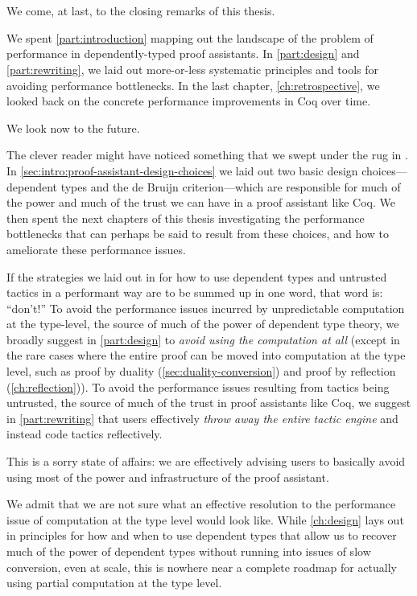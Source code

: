 \chapter{}\label{ch:conclusion}
We come, at last, to the closing remarks of this thesis.

We spent \autoref{part:introduction} mapping out the landscape of the problem of performance in dependently-typed proof assistants.
In \autoref{part:design} and \autoref{part:rewriting}, we laid out more-or-less systematic principles and tools for avoiding performance bottlenecks.
In the last chapter, \autoref{ch:retrospective}, we looked back on the concrete performance improvements in Coq over time.

We look now to the future.

The clever reader might have noticed something that we swept under the rug in .
In \autoref{sec:intro:proof-assistant-design-choices} we laid out two basic design choices---dependent types and the de Bruijn criterion---which are responsible for much of the power and much of the trust we can have in a proof assistant like Coq.
We then spent the next chapters of this thesis investigating the performance bottlenecks that can perhaps be said to result from these choices, and how to ameliorate these performance issues.

If the strategies we laid out in  for how to use dependent types and untrusted tactics in a performant way are to be summed up in one word, that word is: ``don't!''
To avoid the performance issues incurred by unpredictable computation at the type-level, the source of much of the power of dependent type theory, we broadly suggest in \autoref{part:design} to \emph{avoid using the computation at all} (except in the rare cases where the entire proof can be moved into computation at the type level, such as proof by duality (\autoref{sec:duality-conversion}) and proof by reflection (\autoref{ch:reflection})).
To avoid the performance issues resulting from tactics being untrusted, the source of much of the trust in proof assistants like Coq, we suggest in \autoref{part:rewriting} that users effectively \emph{throw away the entire tactic engine} and instead code tactics reflectively.

This is a sorry state of affairs:
we are effectively advising users to basically avoid using most of the power and infrastructure of the proof assistant.

We admit that we are not sure what an effective resolution to the performance issue of computation at the type level would look like.
While \autoref{ch:design} lays out in  principles for how and when to use dependent types that allow us to recover much of the power of dependent types without running into issues of slow conversion, even at scale, this is nowhere near a complete roadmap for actually using partial computation at the type level.

